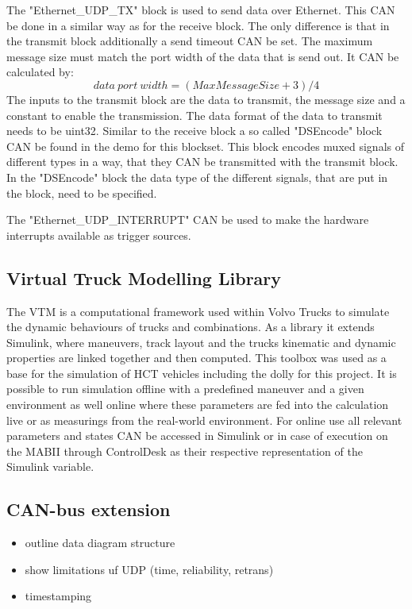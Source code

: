 \documentclass[ExampleMasters.tex]{subfiles}
\begin{document}
The "Ethernet\_UDP\_TX" block is used to send data over Ethernet. This \gls{CAN} be done in a similar way as for the receive block. The only difference is that in the transmit block additionally a send timeout \gls{CAN} be set. The maximum message size must match the port width of the data that is send out. It \gls{CAN} be calculated by:
\begin{equation}
data\ port\ width=(MaxMessageSize + 3) / 4
\end{equation}
The inputs to the transmit block are the data to transmit, the message size and a constant to enable the transmission. The data format of the data to transmit needs to be uint32. Similar to the receive block a so called "DSEncode" block \gls{CAN} be found in the demo for this blockset. This block encodes muxed signals of different types in a way, that they \gls{CAN} be transmitted with the transmit block. In the "DSEncode" block the data type of the different signals, that are put in the block, need to be specified.

The "Ethernet\_UDP\_INTERRUPT" \gls{CAN} be used to make the hardware interrupts available as trigger sources.
\subsection{Virtual Truck Modelling Library}
\label{sec:VTM}
The \gls{VTM} is a computational framework used within Volvo Trucks to simulate the dynamic behaviours of trucks and combinations. As a library it extends Simulink, where maneuvers, track layout and the trucks kinematic and dynamic properties are linked together and then computed. This toolbox was used as a base for the simulation of \gls{HCT} vehicles including the dolly for this project. It is possible to run simulation offline with a predefined maneuver and a given environment as well online where these parameters are fed into the calculation live or as measurings from the real-world environment. For online use all relevant parameters and states \gls{CAN} be accessed in Simulink or in case of execution on the \gls{MABII} through ControlDesk as their respective representation of the Simulink variable. 

\subsection{CAN-bus extension}
\label{sec:can_bus_extension_software}

\begin{itemize}
	\item outline data diagram structure
	\item show limitations uf \gls{UDP} (time, reliability, retrans)
	\item timestamping
	
	
\end{itemize}
\end{document}

